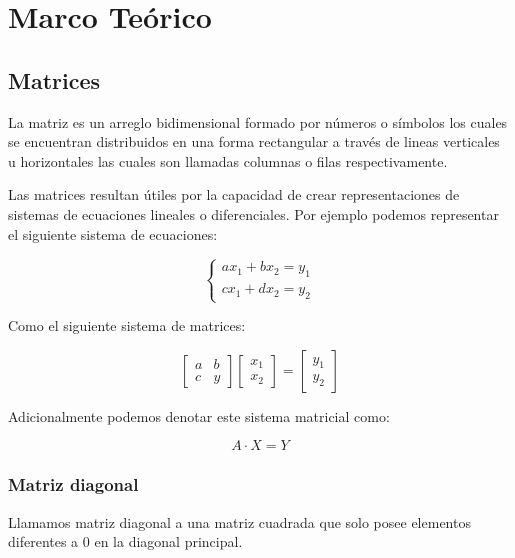 \section{Marco Teórico} %
\label{sec:Marco Teórico}

\subsection{Matrices}
\begin{definition}
La matriz es un arreglo bidimensional formado por números o símbolos los cuales se encuentran distribuidos en una forma rectangular a través de lineas verticales u horizontales las cuales son llamadas columnas o filas respectivamente.
\end{definition}

Las matrices resultan útiles por la capacidad de crear representaciones de sistemas de ecuaciones lineales o diferenciales. Por ejemplo podemos representar el siguiente sistema de ecuaciones:

\[
    \begin{cases}
        ax_1 + bx_2 = y_1\\
        cx_1 + dx_2 = y_2
    \end{cases}
\]

Como el siguiente sistema de matrices:

\[
\left[\begin{array}{cc}
    a & b \\
    c & y
\end{array}\right]
\left[\begin{array}{c}
    x_1\\
    x_2 
\end{array}\right] =
\left[\begin{array}{c}
    y_1\\
    y_2 
\end{array}\right]
\]

Adicionalmente podemos denotar este sistema matricial como:

\[
    A\cdot X = Y
\]

\subsubsection{Matriz diagonal}
\begin{definition}
Llamamos matriz diagonal a una matriz cuadrada que solo posee elementos diferentes a $0$ en la diagonal principal. 
\end{definition}


